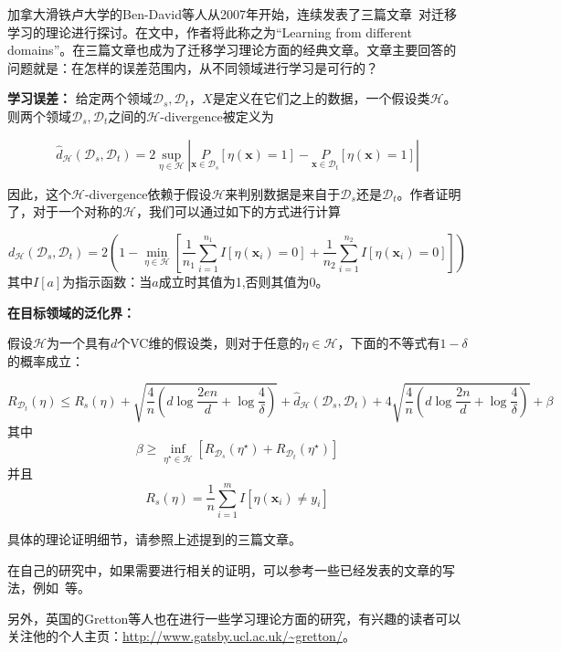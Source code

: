 加拿大滑铁卢大学的Ben-David等人从2007年开始，连续发表了三篇文章~\cite{ben2007analysis,blitzer2008learning,ben2010theory}对迁移学习的理论进行探讨。在文中，作者将此称之为“Learning from different domains”。在三篇文章也成为了迁移学习理论方面的经典文章。文章主要回答的问题就是：在怎样的误差范围内，从不同领域进行学习是可行的？

\textbf{学习误差：} 给定两个领域$\mathcal{D}_s,\mathcal{D}_t$，$X$是定义在它们之上的数据，一个假设类$\mathcal{H}$。则两个领域$\mathcal{D}_s,\mathcal{D}_t$之间的$\mathcal{H}$-divergence被定义为

\begin{equation}
	\hat{d}_{\mathcal{H}}(\mathcal{D}_s,\mathcal{D}_t) = 2 \sup_{\eta \in \mathcal{H}} \left|\underset{\mathbf{x} \in \mathcal{D}_s}{P}[\eta(\mathbf{x}) = 1] - \underset{\mathbf{x} \in \mathcal{D}_t}{P}[\eta(\mathbf{x}) = 1] \right|
\end{equation}

因此，这个$\mathcal{H}$-divergence依赖于假设$\mathcal{H}$来判别数据是来自于$\mathcal{D}_s$还是$\mathcal{D}_t$。作者证明了，对于一个对称的$\mathcal{H}$，我们可以通过如下的方式进行计算

\begin{equation}
	d_\mathcal{H} (\mathcal{D}_s,\mathcal{D}_t) = 2 \left(1 - \min_{\eta \in \mathcal{H}} \left[\frac{1}{n_1} \sum_{i=1}^{n_1} I[\eta(\mathbf{x}_i)=0] + \frac{1}{n_2} \sum_{i=1}^{n_2} I[\eta(\mathbf{x}_i)=0]\right] \right)
\end{equation}
其中$I[a]$为指示函数：当$a$成立时其值为1,否则其值为0。

\textbf{在目标领域的泛化界：}

假设$\mathcal{H}$为一个具有$d$个VC维的假设类，则对于任意的$\eta \in \mathcal{H}$，下面的不等式有$1 - \delta$的概率成立：

\begin{equation}
	R_{\mathcal{D}_t}(\eta) \le R_s(\eta) + \sqrt{\frac{4}{n}(d \log \frac{2en}{d} + \log \frac{4}{\delta})} + \hat{d}_{\mathcal{H}}(\mathcal{D}_s,\mathcal{D}_t) + 4 \sqrt{\frac{4}{n}(d \log \frac{2n}{d} + \log \frac{4}{\delta})} + \beta
\end{equation}
其中
\begin{equation}
	\beta \ge \inf_{\eta^\star \in \mathcal{H}} [R_{\mathcal{D}_s}(\eta^\star) + R_{\mathcal{D}_t}(\eta^\star)]
\end{equation}
并且
\begin{equation}
	R_{s}(\eta) = \frac{1}{n} \sum_{i=1}^{m} I[\eta(\mathbf{x}_i) \ne y_i]
\end{equation}

具体的理论证明细节，请参照上述提到的三篇文章。

在自己的研究中，如果需要进行相关的证明，可以参考一些已经发表的文章的写法，例如~\cite{long2014adaptation}等。

另外，英国的Gretton等人也在进行一些学习理论方面的研究，有兴趣的读者可以关注他的个人主页：\url{http://www.gatsby.ucl.ac.uk/~gretton/}。
